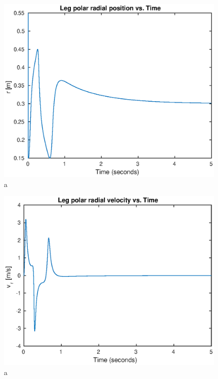 \begin{figure}
\centering
\includegraphics[width=1\textwidth]{images/simulation/r.eps}
\caption{a}
\label{fig:a}
\end{figure}

\begin{figure}
\centering
\includegraphics[width=1\textwidth]{images/simulation/vr.eps}
\caption{a}
\label{fig:a}
\end{figure}

